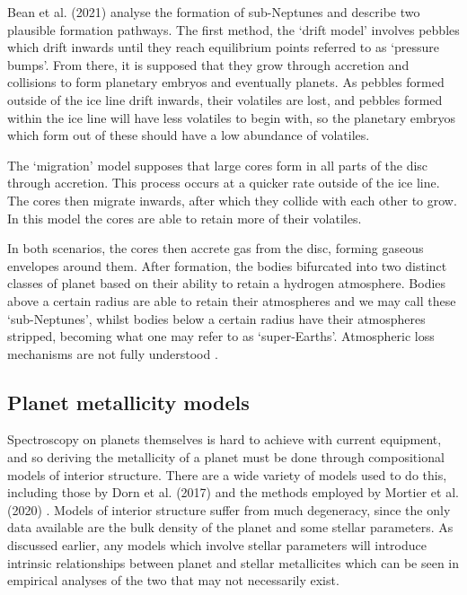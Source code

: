 \documentclass[a4paper,twocolumn,12pt]{article}
\begin{document}

Bean et al. (2021)\cite{NatureAndOriginOfSubNeptunesGoodPaper} analyse the formation of sub-Neptunes and describe two plausible formation pathways. The first method, the `drift model' involves pebbles which drift inwards until they reach equilibrium points referred to as `pressure bumps'. From there, it is supposed that they grow through accretion and collisions to form planetary embryos and eventually planets. As pebbles formed outside of the ice line drift inwards, their volatiles are lost, and pebbles formed within the ice line will have less volatiles to begin with, so the planetary embryos which form out of these should have a low abundance of volatiles.

The `migration' model supposes that large cores form in all parts of the disc through accretion. This process occurs at a quicker rate outside of the ice line. The cores then migrate inwards, after which they collide with each other to grow. In this model the cores are able to retain more of their volatiles.

In both scenarios, the cores then accrete gas from the disc, forming gaseous envelopes around them. After formation, the bodies bifurcated into two distinct classes of planet based on their ability to retain a hydrogen atmosphere. Bodies above a certain radius are able to retain their atmospheres and we may call these `sub-Neptunes', whilst bodies below a certain radius have their atmospheres stripped, becoming what one may refer to as `super-Earths'. Atmospheric loss mechanisms are not fully understood \cite{NatureAndOriginOfSubNeptunesGoodPaper}.


\subsection{Planet metallicity models}
\label{subsection: Planet Metallicity Models}
\vspace{-0.3em}
Spectroscopy on planets themselves is hard to achieve with current equipment, and so deriving the metallicity of a planet must be done through compositional models of interior structure. There are a wide variety of models used to do this, including those by Dorn et al. (2017) \cite{SussyInteriorModelsSuper-EarthsAndSub-Neptunes} and the methods employed by Mortier et al. (2020) \cite{MortierInteriorStructure}. Models of interior structure suffer from much degeneracy, since the only data available are the bulk density of the planet and some stellar parameters. As discussed earlier, any models which involve stellar parameters will introduce intrinsic relationships between planet and stellar metallicites which can be seen in empirical analyses of the two that may not necessarily exist.
\end{document}
